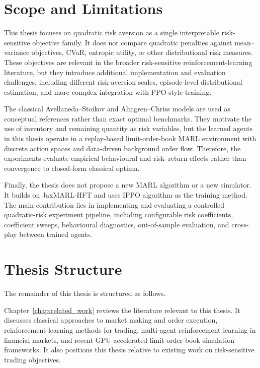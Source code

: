 \documentclass[oneside]{uva-inf-bachelor-thesis}
\begin{document}
\section{Scope and Limitations}

This thesis focuses on quadratic risk aversion as a single interpretable risk-sensitive objective family. It does not compare quadratic penalties against mean--variance objectives, CVaR, entropic utility, or other distributional risk measures. These objectives are relevant in the broader risk-sensitive reinforcement-learning literature, but they introduce additional implementation and evaluation challenges, including different risk-aversion scales, episode-level distributional estimation, and more complex integration with PPO-style training.

The classical Avellaneda--Stoikov and Almgren--Chriss models are used as conceptual references rather than exact optimal benchmarks. They motivate the use of inventory and remaining quantity as risk variables, but the learned agents in this thesis operate in a replay-based limit-order-book MARL environment with discrete action spaces and data-driven background order flow. Therefore, the experiments evaluate empirical behavioural and risk--return effects rather than convergence to closed-form classical optima.

Finally, the thesis does not propose a new MARL algorithm or a new simulator. It builds on JaxMARL-HFT and uses IPPO algorithm as the training method. The main contribution lies in implementing and evaluating a controlled quadratic-risk experiment pipeline, including configurable risk coefficients, coefficient sweeps, behavioural diagnostics, out-of-sample evaluation, and cross-play between trained agents.

\section{Thesis Structure}

The remainder of this thesis is structured as follows.

Chapter~\ref{chap:related_work} reviews the literature relevant to this thesis. It discusses classical approaches to market making and order execution, reinforcement-learning methods for trading, multi-agent reinforcement learning in financial markets, and recent GPU-accelerated limit-order-book simulation frameworks. It also positions this thesis relative to existing work on risk-sensitive trading objectives.
\end{document}
